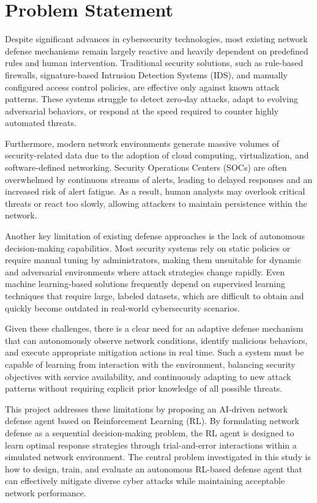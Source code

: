 \documentclass[12pt,a4paper]{report}
\begin{document}
\section{Problem Statement}

Despite significant advances in cybersecurity technologies, most existing network defense mechanisms remain largely reactive and heavily dependent on predefined rules and human intervention.
Traditional security solutions, such as rule-based firewalls, signature-based Intrusion Detection Systems (IDS), and manually configured access control policies, are effective only against known attack patterns.
These systems struggle to detect zero-day attacks, adapt to evolving adversarial behaviors, or respond at the speed required to counter highly automated threats.

Furthermore, modern network environments generate massive volumes of security-related data due to the adoption of cloud computing, virtualization, and software-defined networking.
Security Operations Centers (SOCs) are often overwhelmed by continuous streams of alerts, leading to delayed responses and an increased risk of alert fatigue.
As a result, human analysts may overlook critical threats or react too slowly, allowing attackers to maintain persistence within the network.

Another key limitation of existing defense approaches is the lack of autonomous decision-making capabilities.
Most security systems rely on static policies or require manual tuning by administrators, making them unsuitable for dynamic and adversarial environments where attack strategies change rapidly.
Even machine learning-based solutions frequently depend on supervised learning techniques that require large, labeled datasets, which are difficult to obtain and quickly become outdated in real-world cybersecurity scenarios.

Given these challenges, there is a clear need for an adaptive defense mechanism that can autonomously observe network conditions, identify malicious behaviors, and execute appropriate mitigation actions in real time.
Such a system must be capable of learning from interaction with the environment, balancing security objectives with service availability, and continuously adapting to new attack patterns without requiring explicit prior knowledge of all possible threats.

This project addresses these limitations by proposing an AI-driven network defense agent based on Reinforcement Learning (RL).
By formulating network defense as a sequential decision-making problem, the RL agent is designed to learn optimal response strategies through trial-and-error interactions within a simulated network environment.
The central problem investigated in this study is how to design, train, and evaluate an autonomous RL-based defense agent that can effectively mitigate diverse cyber attacks while maintaining acceptable network performance.
\end{document}
